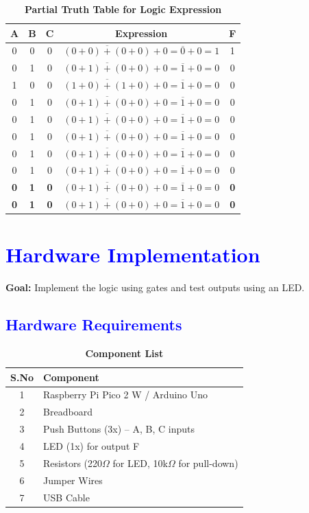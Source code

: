\documentclass[twocolumn]{article}
\begin{document}
\begin{table}[h]
\centering
\renewcommand{\arraystretch}{1.3}
\begin{tabular}{|c|c|c|c|c|}
\hline
A & B & C & Expression & F \\
\hline
0 & 0 & 0 & $\overline{(0+0)+(0+0)}+0 = \overline{0}+0 = 1$ & 1 \\
0 & 1 & 0 & $\overline{(0+1)+(0+0)}+0 = \overline{1}+0 = 0$ & 0 \\
1 & 0 & 0 & $\overline{(1+0)+(1+0)}+0 = \overline{1}+0 = 0$ & 0 \\
0 & 1 & 0 & $\overline{(0+1)+(0+0)}+0 = \overline{1}+0 = 0$ & 0 \\
0 & 1 & 0 & $\overline{(0+1)+(0+0)}+0 = \overline{1}+0 = 0$ & 0 \\
0 & 1 & 0 & $\overline{(0+1)+(0+0)}+0 = \overline{1}+0 = 0$ & 0 \\
0 & 1 & 0 & $\overline{(0+1)+(0+0)}+0 = \overline{1}+0 = 0$ & 0 \\
0 & 1 & 0 & $\overline{(0+1)+(0+0)}+0 = \overline{1}+0 = 0$ & 0 \\
\textbf{0} & \textbf{1} & \textbf{0} & $\overline{(0+1)+(0+0)}+0 = \overline{1}+0 = 0$ & \textbf{0} \\
\textbf{0} & \textbf{1} & \textbf{0} & $\overline{(0+1)+(0+0)}+0 = \overline{1}+0 = 0$ & \textbf{0} \\
\hline
\end{tabular}
\caption*{\textbf{Partial Truth Table for Logic Expression}}
\end{table}

\section*{\textcolor{blue}{Hardware Implementation}}

\textbf{Goal:} Implement the logic using gates and test outputs using an LED.

\subsection*{\textcolor{blue}{Hardware Requirements}}

\begin{table}[h]
\centering
\renewcommand{\arraystretch}{1.3}
\begin{tabular}{|c|l|}
\hline
\textbf{S.No} & \textbf{Component} \\
\hline
1 & Raspberry Pi Pico 2 W / Arduino Uno \\
2 & Breadboard \\
3 & Push Buttons (3x) – A, B, C inputs \\
4 & LED (1x) for output F \\
5 & Resistors (220$\Omega$ for LED, 10k$\Omega$ for pull-down) \\
6 & Jumper Wires \\
7 & USB Cable \\
\hline
\end{tabular}
\caption*{\textbf{Component List}}
\end{table}
\end{document}
